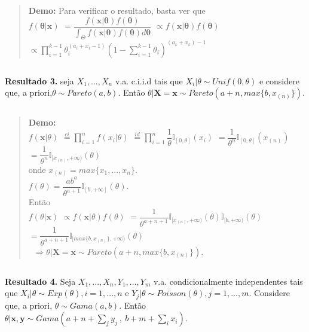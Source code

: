 \documentclass[
]{book}
\begin{document}
\(~\)

\begin{quote}
\textbf{Demo:} Para verificar o resultado, basta ver que\\
\(f(\boldsymbol\theta|\boldsymbol x)\) \(=\dfrac{f(\boldsymbol x| \boldsymbol \theta)f(\boldsymbol \theta)}{\int_\Theta f(\boldsymbol x| \boldsymbol \theta)f(\boldsymbol \theta)d\boldsymbol \theta}\) \(\propto f(\boldsymbol x| \boldsymbol \theta)f(\boldsymbol \theta)\) \(\propto \prod_{i=1}^{k-1}\theta_i^{(a_i+x_i-1)}\left(1-\sum_{i=1}^{k-1}\theta_i\right)^{(a_k+x_k)-1}\)
\end{quote}

\(~\)

\textbf{Resultado 3.} seja \(X_1,...,X_n\) v.a. c.i.i.d tais que \(X_i|\theta \sim Unif(0,\theta)\) e considere que, a priori,\(\theta \sim Pareto(a,b)\). Então \(\theta|\boldsymbol X = \boldsymbol x \sim Pareto\left(a+n,max\{b,x_{(n)}\}\right)\).

\(~\)

\begin{quote}
\textbf{Demo:}\\
\(f(\boldsymbol x|\theta)\) \(\overset{ci}{=}\prod_{i=1}^nf(x_i|\theta)\) \(\overset{id}{=}\prod_{i=1}^n\dfrac{1}{\theta}\mathbb{I}_{[0,\theta]}(x_i)\) \(=\dfrac{1}{\theta^n}\mathbb{I}_{[0,\theta]}(x_{(n)})\) \(=\dfrac{1}{\theta^n}\mathbb{I}_{[x_{(n)},+\infty)}(\theta)\)\\
onde \(x_{(n)}=max\{x_1,...,x_n\}\).\\
\(~\)\\
\(f(\theta)=\dfrac{ab^a}{\theta^{a+1}}\mathbb{I}_{[b,+\infty]}(\theta)\).\\
Então\\
\(f(\theta| \boldsymbol x)\) \(\propto f(\boldsymbol x|\theta)f(\theta)\) \(=\dfrac{1}{\theta^{a+n+1}}\mathbb{I}_{[x_{(n)},+\infty)}(\theta)\mathbb{I}_{[b,+\infty)}(\theta)\) \(=\dfrac{1}{\theta^{a+n+1}}\mathbb{I}_{[max\{b,x_{(n)}\},+\infty)}(\theta)\)\\
\(~\)
\(\Rightarrow \theta|\boldsymbol X = \boldsymbol x \sim Pareto(a+n,max\{b,x_{(n)}\})\).
\end{quote}

\(~\)

\textbf{Resultado 4.} Seja \(X_1,...,X_n,Y_1,...,Y_m\) v.a. condicionalmente independentes tais que \(X_i|\theta\sim Exp(\theta),i=1,...,n\) e \(Y_j|\theta \sim Poisson(\theta),j=1,...,m\). Considere que, a priori, \(\theta \sim Gama(a,b)\). Então \(\theta| \boldsymbol x,\boldsymbol y \sim Gama(a+n+\sum_jy_j~,~b+m+\sum_ix_i)\).
\end{document}
